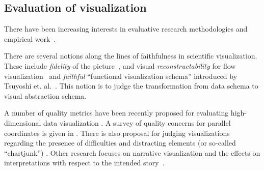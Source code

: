 \documentclass[10pt,journal,cspaper,compsoc]{IEEEtran}
\begin{document}



\subsection{Evaluation of visualization}
There have been increasing interests in evaluative research methodologies and empirical work~\cite{van2005value,purchase2008theoretical,carpendale2008evaluating,chen2009data,lam2011seven,lam2012empirical}.

There are several notions along the lines of faithfulness in
scientific visualization. These include {\em fidelity} of the
picture~\cite{matsuyama2004real}, and visual \emph{reconstructability}
for flow visualization~\cite{jänicke2011visual} and {\em faithful} ``functional visualization schema'' introduced by Tsuyoshi et. al.~\cite{Sugibuchi2009}. This notion is to judge the transformation from data schema to visual abstraction schema.

A number of quality metrics have been recently proposed for evaluating high-dimensional data visualization \cite{bertini2011quality}.
A survey of quality concerns for parallel coordinates is given in \cite{dasgupta2011adaptive}.
There is also proposal for judging visualizations regarding the presence of difficulties and distracting elements (or so-called ``chartjunk'') \cite{hullman2011benefitting}.
Other research focuses on narrative visualization and the effects on interpretations with respect to the intended story~\cite{hullman2011visualization}. 
\end{document}

